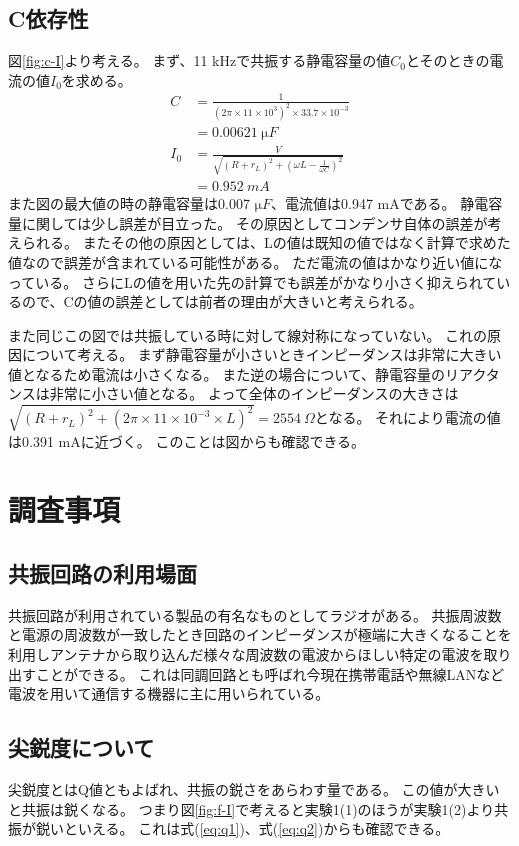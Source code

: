 \documentclass[11pt,a4paper,fleqn]{jsarticle}
\begin{document}
\subsection{C依存性}
図\ref{fig:c-I}より考える。
まず、11 kHzで共振する静電容量の値$C_{0}$とそのときの電流の値$I_{0}$を求める。
\begin{align}
C&=\frac{1}{(2\pi \times 11\times 10^{3})^2\times 33.7\times 10^{-3}}\\
&=0.00621\ \si{\micro F}\\
I_{0}&=\frac{V}{\sqrt{(R+r_{L})^2+(\omega L-\frac{1}{\omega C})^2}}\\
&=0.952\ \si{mA}
\end{align}
また図の最大値の時の静電容量は0.007 $\si{\micro F}$、電流値は0.947 mAである。
静電容量に関しては少し誤差が目立った。
その原因としてコンデンサ自体の誤差が考えられる。
またその他の原因としては、Lの値は既知の値ではなく計算で求めた値なので誤差が含まれている可能性がある。
ただ電流の値はかなり近い値になっている。
さらにLの値を用いた先の計算でも誤差がかなり小さく抑えられているので、Cの値の誤差としては前者の理由が大きいと考えられる。

また同じこの図では共振している時に対して線対称になっていない。
これの原因について考える。
まず静電容量が小さいときインピーダンスは非常に大きい値となるため電流は小さくなる。
また逆の場合について、静電容量のリアクタンスは非常に小さい値となる。
よって全体のインピーダンスの大きさは$\sqrt{(R+r_{L})^2+(2\pi \times 11\times 10^{-3}\times L)^2}=2554\ \Omega$となる。
それにより電流の値は0.391 mAに近づく。
このことは図からも確認できる。

\section{調査事項}
\subsection{共振回路の利用場面}
共振回路が利用されている製品の有名なものとしてラジオがある。
共振周波数と電源の周波数が一致したとき回路のインピーダンスが極端に大きくなることを利用しアンテナから取り込んだ様々な周波数の電波からほしい特定の電波を取り出すことができる。
これは同調回路とも呼ばれ今現在携帯電話や無線LANなど電波を用いて通信する機器に主に用いられている。

\subsection{尖鋭度について}
尖鋭度とはQ値ともよばれ、共振の鋭さをあらわす量である。
この値が大きいと共振は鋭くなる。
つまり図\ref{fig:f-I}で考えると実験1(1)のほうが実験1(2)より共振が鋭いといえる。
これは式(\ref{eq:q1})、式(\ref{eq:q2})からも確認できる。
\end{document}
